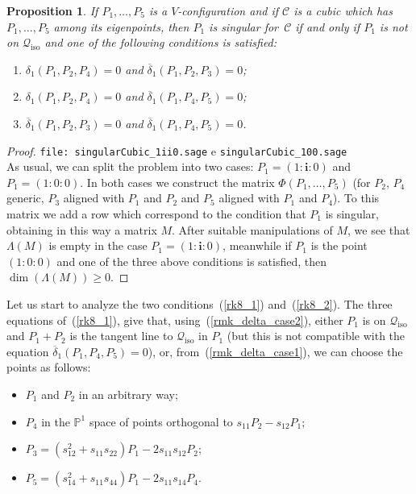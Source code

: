 \documentclass{amsart}
\theoremstyle{plain}
\newtheorem{prop}[lemma]{Proposition}
\theoremstyle{definition}
\newcommand{\iso}{\mathcal{Q}_{\mathrm{iso}}}
\newcommand{\iii}{\textbf{i}}
\begin{document}
\begin{prop}
\label{proposition:P1_sing}
If $P_1, \dots, P_5$ is a $V$-configuration and if
$\mathcal{C}$ is a cubic which
has $P_1, \dots, P_5$ among its eigenpoints, then $P_1$ is
singular for~$\mathcal{C}$ if
and only if $P_1$ is not on $\iso$ and one of the following conditions
is satisfied:
\begin{enumerate}
\item $\delta_1(P_1, P_2, P_4) = 0$ and $\overline{\delta}_1(P_1, P_2, P_3) = 0$;
\item $\delta_1(P_1, P_2, P_4) = 0$ and $\overline{\delta}_1(P_1, P_4, P_5) = 0$;
\item $\overline{\delta}_1(P_1, P_2, P_3) = 0$ and
$\overline{\delta}_1(P_1, P_4, P_5) = 0$.
\end{enumerate}
\end{prop}
\begin{proof}
\verb+file: singularCubic_1ii0.sage+ e \verb+singularCubic_100.sage+\\
As usual, we can split the problem into two cases: $P_1 = (1: \iii: 0)$
and $P_1 = (1: 0: 0)$. In both cases we construct the matrix
$\Phi(P_1, \dots, P_5)$ (for $P_2$, $P_4$ generic, $P_3$ aligned with
$P_1$ and $P_2$ and $P_5$ aligned with $P_1$ and $P_4$). To this matrix we add
a row which correspond to the condition that $P_1$ is singular, obtaining
in this way a matrix $M$. After
suitable manipulations of $M$, we see that $\Lambda(M)$ is empty
in the case $P_1=(1: \iii: 0)$, meanwhile if $P_1$ is the point $(1:0:0)$
and one of the three above conditions is satisfied, then
$\dim(\Lambda(M)) \geq 0$.
\end{proof}

Let us start to analyze the two conditions~(\ref{rk8_1}) and~(\ref{rk8_2}).
The three equations of~(\ref{rk8_1}), give that,
using~(\ref{rmk_delta_case2}), either $P_1$ is on $\iso$ and
$P_1+P_2$ is the tangent line to $\iso$ in $P_1$ (but this is not compatible
with the equation $\overline{\delta}_1(P_1, P_4, P_5)=0$), or,
from~(\ref{rmk_delta_case1}), we can choose the points as follows:
\begin{itemize}
\item $P_1$ and $P_2$ in an arbitrary way;
\item $P_4$ in the $\mathbb{P}^1$
space of points orthogonal to $s_{11}P_2-s_{12}P_1$;
\item $P_3 = (s_{12}^2+s_{11}s_{22})P_1-2s_{11}s_{12}P_2$;
\item $P_5 = (s_{14}^2+s_{11}s_{44})P_1-2s_{11}s_{14}P_4$.
\end{itemize}
\end{document}
